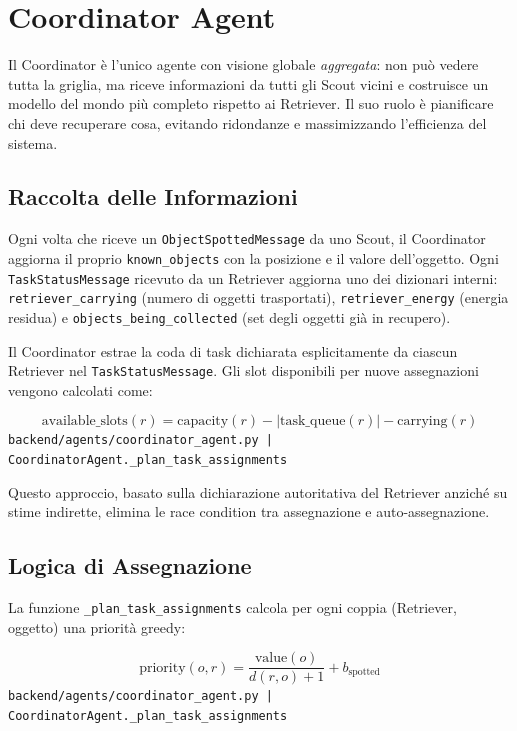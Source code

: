 \chapter{Coordinator Agent}

Il Coordinator \`e l'unico agente con visione globale \textit{aggregata}: non pu\`o vedere
tutta la griglia, ma riceve informazioni da tutti gli Scout vicini e costruisce un modello
del mondo pi\`u completo rispetto ai Retriever. Il suo ruolo \`e pianificare chi deve
recuperare cosa, evitando ridondanze e massimizzando l'efficienza del sistema.

\section{Raccolta delle Informazioni}

Ogni volta che riceve un \texttt{ObjectSpottedMessage} da uno Scout, il Coordinator aggiorna
il proprio \texttt{known\_objects} con la posizione e il valore dell'oggetto. Ogni
\texttt{TaskStatusMessage} ricevuto da un Retriever aggiorna uno dei dizionari interni:
\texttt{retriever\_carrying} (numero di oggetti trasportati), \texttt{retriever\_energy}
(energia residua) e \texttt{objects\_being\_collected} (set degli oggetti già in recupero).

Il Coordinator estrae la coda di task dichiarata esplicitamente da ciascun Retriever
nel \texttt{TaskStatusMessage}. Gli slot disponibili per nuove assegnazioni vengono
calcolati come:

$$\text{available\_slots}(r) = \text{capacity}(r) - |\text{task\_queue}(r)| - \text{carrying}(r)$$
\noindent\hfill{\footnotesize\texttt{backend/agents/coordinator\_agent.py | CoordinatorAgent.\_plan\_task\_assignments}}

Questo approccio, basato sulla dichiarazione autoritativa del Retriever anziché su
stime indirette, elimina le race condition tra assegnazione e auto-assegnazione.

\section{Logica di Assegnazione}

La funzione \texttt{\_plan\_task\_assignments} calcola per ogni coppia (Retriever, oggetto)
una priorit\`a greedy:

$$\text{priority}(o, r) = \frac{\text{value}(o)}{d(r, o) + 1} + b_{\text{spotted}}$$
\noindent\hfill{\footnotesize\texttt{backend/agents/coordinator\_agent.py | CoordinatorAgent.\_plan\_task\_assignments}}

